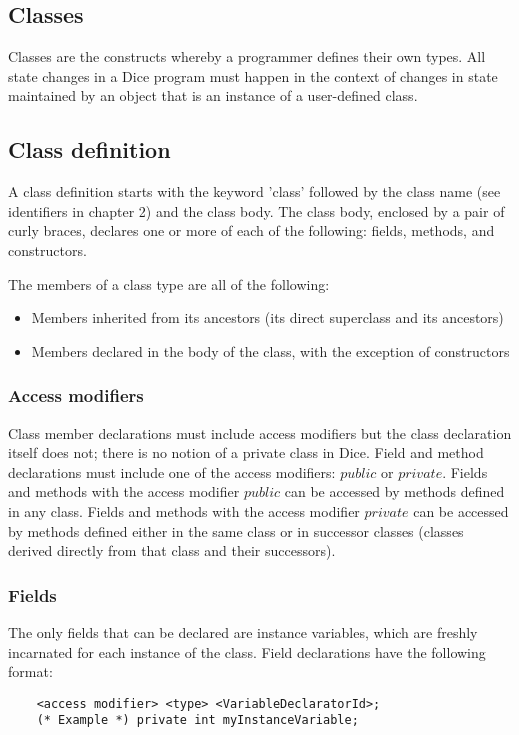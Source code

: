 \begin{homeworkProblem}
	\chapter{Classes}
	
	Classes are the constructs whereby a programmer defines their own types. All state changes in a Dice program must happen in the context of changes in state maintained by an object that is an instance of a user-defined class.
	
	\section{Class definition}
	A class definition starts with the keyword 'class' followed by the class name (see identifiers in chapter 2) and the class body. The class body, enclosed by a pair of curly braces, declares one or more of each of the following: fields, methods, and constructors.
	
	The members of a class type are all of the following:
	\begin{itemize}
		\item Members inherited from its ancestors (its direct superclass and its ancestors)
		\item Members declared in the body of the class, with the exception of constructors
	\end{itemize}
	
	\subsection{Access modifiers}
	Class member declarations must include access modifiers but the class declaration itself does not; there is no notion of a private class in Dice. Field and method declarations must include one of the access modifiers: $public$ or $private$. Fields and methods with the access modifier $public$ can be accessed by methods defined in any class. Fields and methods with the access modifier $private$ can be accessed by methods defined either in the same class or in successor classes (classes derived directly from that class and their successors).
	
	\subsection{Fields}
	The only fields that can be declared are instance variables, which are freshly incarnated for each instance of the class.
	Field declarations have the following format:
	\begin{verbatim}
	<access modifier> <type> <VariableDeclaratorId>;
	(* Example *) private int myInstanceVariable;
	\end{verbatim}


\end{homeworkProblem}
